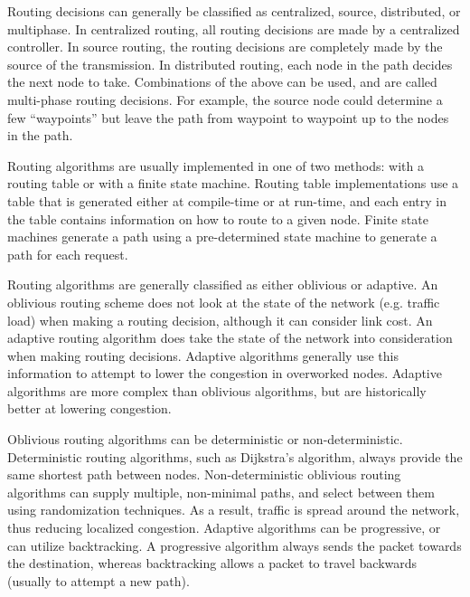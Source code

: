 Routing decisions can generally be classified as centralized, source, distributed, or multiphase. In centralized routing, all routing decisions are made by a centralized controller. In source routing, the routing decisions are completely made by the source of the transmission. In distributed routing, each node in the path decides the next node to take. Combinations of the above can be used, and are called multi-phase routing decisions. For example, the source node could determine a few ``waypoints'' but leave the path from waypoint to waypoint up to the nodes in the path. \cite{ref:1997-duato-interconnection_networks}

Routing algorithms are usually implemented in one of two methods: with a routing table or with a finite state machine. Routing table implementations use a table that is generated either at compile-time or at run-time, and each entry in the table contains information on how to route to a given node. Finite state machines generate a path using a pre-determined state machine to generate a path for each request. \cite{ref:1997-duato-interconnection_networks}

Routing algorithms are generally classified as either oblivious or adaptive. An oblivious routing scheme does not look at the state of the network (e.g. traffic load) when making a routing decision, although it can consider link cost. An adaptive routing algorithm does take the state of the network into consideration when making routing decisions. Adaptive algorithms generally use this information to attempt to lower the congestion in overworked nodes. Adaptive algorithms are more complex than oblivious algorithms, but are historically better at lowering congestion. \cite{ref:1997-duato-interconnection_networks}

Oblivious routing algorithms can be deterministic or non-deterministic. Deterministic routing algorithms, such as Dijkstra's algorithm, always provide the same shortest path between nodes. Non-deterministic oblivious routing algorithms can supply multiple, non-minimal paths, and select between them using randomization techniques. As a result, traffic is spread around the network, thus reducing localized congestion. \cite{ref:2003-racke-oblivious_routing} Adaptive algorithms can be progressive, or can utilize backtracking. A progressive algorithm always sends the packet towards the destination, whereas backtracking allows a packet to travel backwards (usually to attempt a new path). \cite{ref:1997-duato-interconnection_networks}


